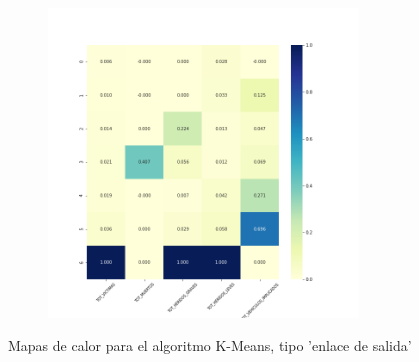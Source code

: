 \begin{figure}[H]
\begin{subfigure}{.5\textwidth}
\end{subfigure}
\begin{subfigure}{.5\textwidth}
  \centering
  \includegraphics[width=0.9\textwidth]{imagenes/case1/kmeans/heatmaps/hm_kmeans_case1_salida_k7.png}
\end{subfigure}
\caption{Mapas de calor para el algoritmo K-Means, tipo 'enlace de salida'}
\label{fig:hm-km}
\end{figure}

